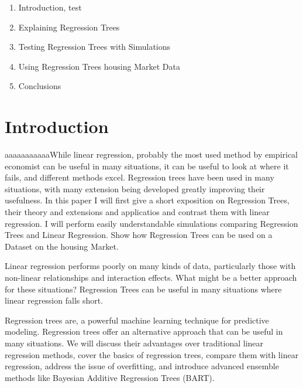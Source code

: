\documentclass[12pt]{article}
\begin{document}
\onehalfspacing                  	




\begin{enumerate}
    \item Introduction, test
    \item Explaining Regression Trees
    \item Testing Regression Trees with Simulations
    \item Using Regression Trees housing Market Data
    \item Conclusions
\end{enumerate}


\section{Introduction}
aaaaaaaaaaaWhile linear regression, probably the most used method by empirical economist can be useful in many situations, it can be useful to look at where it fails, and different methods excel. Regression trees have been used in many situations, with many extension being developed greatly improving their usefulness. In this paper I will first give a short exposition on Regression Trees, their theory and extensions and applicatios and contrast them with linear regression. I will perform easily understandable simulations comparing Regression Trees and Linear Regression. Show how Regression Trees can be used on a Dataset on the housing Market.



Linear regression performs poorly on many kinds of data, particularly those with non-linear relationships and interaction effects. What might be a better approach for these situations? Regression Trees can be useful in many situations where linear regression falls short.

Regression trees are, a powerful machine learning technique for predictive modeling. Regression trees offer an alternative approach that can be useful in many situations. We will discuss their advantages over traditional linear regression methods, cover the basics of regression trees, compare them with linear regression, address the issue of overfitting, and introduce advanced ensemble methods like Bayesian Additive Regression Trees (BART).
\end{document}
